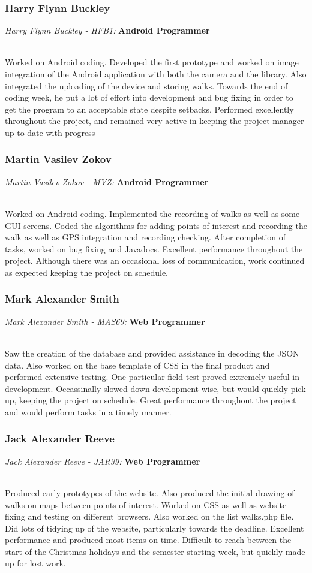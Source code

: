 \documentclass[12pt]{article}
\begin{document}
\subsubsection{Harry Flynn Buckley}
\centerline{\emph{Harry Flynn Buckley - HFB1:}\textbf{ Android Programmer}}
~\\
Worked on Android coding. Developed the first prototype and worked on image integration of the Android application with both the camera and the library. Also integrated the uploading of the device and storing walks. Towards the end of coding week, he put a lot of effort into development and bug fixing in order to get the program to an acceptable state despite setbacks. Performed excellently throughout the project, and remained very active in keeping the project manager up to date with progress

\subsubsection{Martin Vasilev Zokov }
\centerline{\emph{Martin Vasilev Zokov - MVZ:}\textbf{ Android Programmer}}
~\\
Worked on Android coding. Implemented the recording of walks as well as some GUI screens. Coded the algorithms for adding points of interest and recording the walk as well as GPS integration and recording checking. After completion of tasks, worked on bug fixing and Javadocs. Excellent performance throughout the project. Although there was an occasional loss of communication, work continued as expected keeping the project on schedule.

\subsubsection{Mark Alexander Smith}
\centerline{\emph{Mark Alexander Smith - MAS69:}\textbf{ Web Programmer}}
~\\
Saw the creation of the database and provided assistance in decoding the JSON data. Also worked on the base template of CSS in the final product and performed extensive testing. One particular field test proved extremely useful in development. Occassinally slowed down development wise, but would quickly pick up, keeping the project on schedule. Great performance throughout the project and would perform tasks in a timely manner.
\subsubsection{Jack Alexander Reeve}
\centerline{\emph{Jack Alexander Reeve
 - JAR39:}\textbf{ Web Programmer}}
~\\
Produced early prototypes of the website. Also produced the initial drawing of walks on maps between points of interest. Worked on CSS as well as website fixing and testing on different browsers. Also worked on the list walks.php file. Did lots of tidying up of the website, particularly towards the deadline. Excellent performance and produced most items on time. Difficult to reach between the start of the Christmas holidays and the semester starting week, but quickly made up for lost work.
\end{document}
